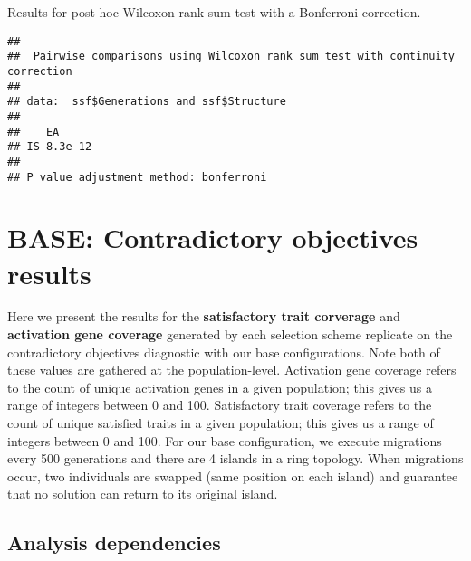 \documentclass[]{book}
\newenvironment{Shaded}{\begin{snugshade}}{\end{snugshade}}
\newcommand{\DataTypeTok}[1]{\textcolor[rgb]{0.13,0.29,0.53}{#1}}
\newcommand{\KeywordTok}[1]{\textcolor[rgb]{0.13,0.29,0.53}{\textbf{#1}}}
\newcommand{\NormalTok}[1]{#1}
\newcommand{\OperatorTok}[1]{\textcolor[rgb]{0.81,0.36,0.00}{\textbf{#1}}}
\newcommand{\OtherTok}[1]{\textcolor[rgb]{0.56,0.35,0.01}{#1}}
\newcommand{\StringTok}[1]{\textcolor[rgb]{0.31,0.60,0.02}{#1}}
\begin{document}
Results for post-hoc Wilcoxon rank-sum test with a Bonferroni correction.

\begin{Shaded}
\end{Shaded}

\begin{verbatim}
## 
##  Pairwise comparisons using Wilcoxon rank sum test with continuity correction 
## 
## data:  ssf$Generations and ssf$Structure 
## 
##    EA     
## IS 8.3e-12
## 
## P value adjustment method: bonferroni
\end{verbatim}

\hypertarget{base-contradictory-objectives-results}{%
\chapter{BASE: Contradictory objectives results}\label{base-contradictory-objectives-results}}

Here we present the results for the \textbf{satisfactory trait corverage} and \textbf{activation gene coverage} generated by each selection scheme replicate on the contradictory objectives diagnostic with our base configurations.
Note both of these values are gathered at the population-level.
Activation gene coverage refers to the count of unique activation genes in a given population; this gives us a range of integers between 0 and 100.
Satisfactory trait coverage refers to the count of unique satisfied traits in a given population; this gives us a range of integers between 0 and 100.
For our base configuration, we execute migrations every 500 generations and there are 4 islands in a ring topology.
When migrations occur, two individuals are swapped (same position on each island) and guarantee that no solution can return to its original island.

\hypertarget{analysis-dependencies-2}{%
\section{Analysis dependencies}\label{analysis-dependencies-2}}
\end{document}
